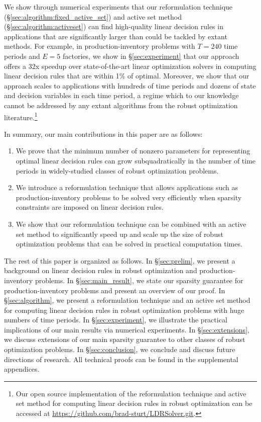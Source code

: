 \documentclass[nonblindrev,mnsc]{informs3} %
\begin{document}
We show through numerical experiments  that our  reformulation technique (\S\ref{sec:algorithm:fixed_active_set}) and active set method (\S\ref{sec:algorithm:activeset}) can find high-quality linear decision rules in applications that are {significantly} larger than could be tackled by  extant methods. For example,  in production-inventory problems with $T = 240$ time periods and $E = 5$ factories, we show in \S\ref{sec:experiment} that our approach 
offers a 32x speedup over state-of-the-art linear optimization solvers in computing linear decision rules that are within 1\% of optimal. Moreover, we show that our approach scales to applications with hundreds of time periods and dozens of state and decision variables in each time period, a regime which to our knowledge cannot be addressed by any extant algorithms from the robust optimization literature.\footnote{Our open source implementation of the  reformulation technique and active set method for computing linear decision rules in robust optimization can be accessed at \url{https://github.com/brad-sturt/LDRSolver.git}.}
 
In summary, our main contributions in this paper are as follows:

\begin{enumerate}
\item We prove that the minimum number of {nonzero} parameters for representing {optimal} linear decision rules can grow subquadratically in the number of time periods  in widely-studied classes of robust optimization problems. 
\item We  introduce a   reformulation technique  that allows applications such as production-inventory problems to be solved very efficiently when sparsity constraints are imposed on linear decision rules.
\item We show that our  reformulation technique can be combined with an active set method to significantly speed up and scale up the size of robust optimization problems that can be solved in practical computation times. 
\end{enumerate}




The rest of this paper is organized as follows. In \S\ref{sec:prelim}, we present a background on linear decision rules in robust optimization and production-inventory problems. In \S\ref{sec:main_result}, we state our sparsity guarantee for production-inventory problems and present an overview of our proof.  In \S\ref{sec:algorithm}, we present a reformulation technique and an active set method  for computing linear decision rules in robust optimization problems with huge numbers of time periods.  In \S\ref{sec:experiment}, we illustrate the practical implications of our main results via numerical experiments. In \S\ref{sec:extensions}, we discuss extensions of our main sparsity guarantee to other classes of robust optimization problems. In \S\ref{sec:conclusion}, we conclude and discuss future directions of research. All technical proofs can be found in the supplemental appendices. 
\end{document}

